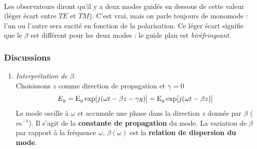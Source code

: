 \ \\

Les observateurs diront qu'il y a deux modes guidés en dessous de cette valeur (léger écart entre
$TE$ et $TM$). C'est vrai, mais on parle toujours de monomode : l'un ou l'autre sera excité en 
fonction de la polarisation. Ce léger écart signifie que le $\beta$ est différent pour les deux modes 
: le guide plan est \textit{biréfringeant}.

\subsubsection{Discussions}
\begin{enumerate}
\item \textit{Interprétation de $\beta$}.\\
Choisissons $z$ comme direction de propagation et $\gamma= 0$
\begin{equation}
{E_y} = {{\rm{E}}_y}\exp [j(\omega t - \beta z - \gamma y)] = {{\rm{E}}_y}\exp [j(\omega t - \beta z)]
\end{equation}
Le mode oscille à $\omega$ et accumule une phase dans la direction $z$ donnée par $\beta$ ($m^{-1}$). 
Il s'agit de la \textbf{constante de propagation} du mode. La variation de $\beta$ par rapport à la 
fréquence $\omega$, $\beta(\omega)$ est la \textbf{relation de dispersion du mode}. \\


\end{enumerate}
